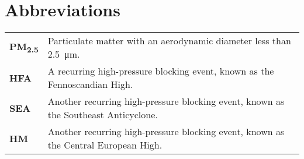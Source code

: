 \section*{Abbreviations}

\begin{tabular}{@{}ll@{}}
    \textbf{PM\textsubscript{2.5}} & Particulate matter with an aerodynamic diameter less than \SI{2.5}{\micro\metre}. \\[7mm]
    \textbf{HFA} &  A recurring high-pressure blocking event, known as the Fennoscandian High. \\[7mm]
    \textbf{SEA} & Another recurring high-pressure blocking event, known as the Southeast Anticyclone. \\[7mm]
    \textbf{HM}  & Another recurring high-pressure blocking event, known as the Central European High. \\
    \end{tabular}



